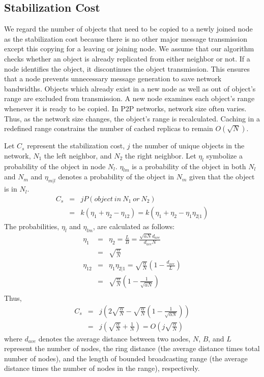 \documentclass[9.5pt,journal,final,finalsubmission,twocolumn]{IEEEtran}
\begin{document}
\subsection{Stabilization Cost}
\label{sec:stabilization_cost}
We regard the number of objects that need to be copied to 
a newly joined node as the stabilization cost 
because there is no other major message transmission 
except this copying for a leaving or joining node. 
We assume that our algorithm checks whether an object 
is already replicated from either neighbor or not. If a node identifies the 
object, it discontinues the object transmission. This ensures that a node 
prevents unnecessary message generation to save network bandwidths.
Objects which already exist in a new node as well as out of 
object's range are excluded from transmission.
A new node examines each object's range whenever it is ready to be copied.
In P2P networks, network size often varies. Thus, as the network
size changes, the object's range is recalculated.
Caching in a redefined range constrains the number of 
cached replicas to remain $O(\sqrt{N})$.
 
Let $C_s$ represent the stabilization cost, $j$ the number of unique objects in the network, 
$N_1$ the left neighbor, 
and $N_2$ the right neighbor. Let $\eta_l$ symbolize a probability of the object in node $N_l$. 
$\eta_{lm}$ is a probability of the object in both $N_l$ and $N_m$ and  
$\eta_{m|l}$ denotes a probability of the object in $N_m$ given that the object is in 
$N_l$. 
\begin{eqnarray*}
C_s &=& j P(object\ in\ N_1\ or\ N_2) \\
    &=& k (\eta_1+\eta_2-\eta_{12}) = k (\eta_1+\eta_2-\eta_1\eta_{2|1})
\end{eqnarray*}
The probabilities, $\eta_l$ and $\eta_{lm}$, are calculated as follows:
\begin{eqnarray*}
\eta_1 &=& \eta_2 = \frac{L}{B} = \frac{\sqrt{\alpha N} d_{ave} }{d_{ave} N} \\
       &=& \sqrt{\frac{\alpha}{N}} \\
\eta_{12} &=& \eta_1 \eta_{2|1} = \sqrt{\frac{\alpha}{N}}\left( 1-\frac{d_{ave}}{L} \right) \\
          &=& \sqrt{\frac{\alpha}{N}}\left(1-\frac{1}{\sqrt{\alpha N}}\right) \\
\end{eqnarray*}
Thus,
\begin{eqnarray}
C_s &=& j\left(2\sqrt{\frac{\alpha}{N}}-\sqrt{\frac{\alpha}{N}}\left(1-\frac{1}{\sqrt{\alpha N}}\right) \right)\nonumber \\
    &=& j(\sqrt{\frac{\alpha}{N}}+\frac{1}{N}) = O\left(j\sqrt{\frac{\alpha}{N}}\right)\label{eq:stab_cost}
\end{eqnarray}
where $d_{ave}$ denotes the average distance between two nodes, 
$N$, $B$, and $L$ represent the number 
of nodes, the ring distance (the average distance times total number of nodes), 
and the length of bounded broadcasting range (the average distance times the number of 
nodes in the range), respectively.
\end{document}

